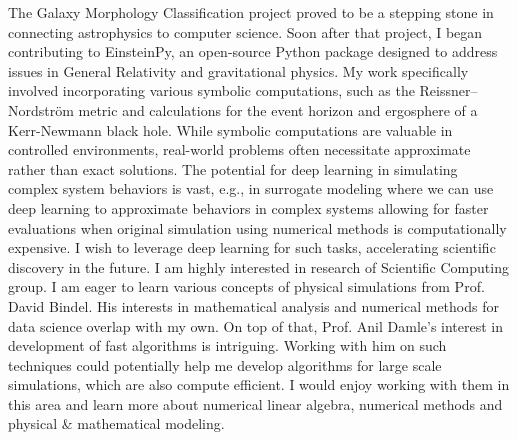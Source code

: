 \documentclass{article}
\begin{document}
\vspace{5pt} 
\hspace{0.25in}The Galaxy Morphology Classification project proved to be a
stepping stone in connecting astrophysics to computer science. Soon after that
project, I began contributing to EinsteinPy, an open-source Python package
designed to address issues in General Relativity and gravitational physics. My
work specifically involved incorporating various symbolic computations, such as
the Reissner–Nordström metric and calculations for the event horizon and
ergosphere of a Kerr-Newmann black hole. While symbolic computations are
valuable in controlled environments, real-world problems often necessitate
approximate rather than exact solutions. The potential for deep learning in
simulating complex system behaviors is vast, e.g., in surrogate modeling where
we can use deep learning to approximate behaviors in complex systems allowing
for faster evaluations when original simulation using numerical methods is
computationally expensive. I wish to leverage deep learning for such tasks,
accelerating scientific discovery in the future. I am highly interested in
research of Scientific Computing group. I am eager to learn various concepts of
physical simulations from Prof. David Bindel. His interests in mathematical
analysis and numerical methods for data science overlap with my own. On top of
that, Prof. Anil Damle’s interest in development of fast algorithms is
intriguing. Working with him on such techniques could potentially help me
develop algorithms for large scale simulations, which are also compute
efficient. I would enjoy working with them in this area and learn more about
numerical linear algebra, numerical methods and physical \& mathematical
modeling.
\end{document}
